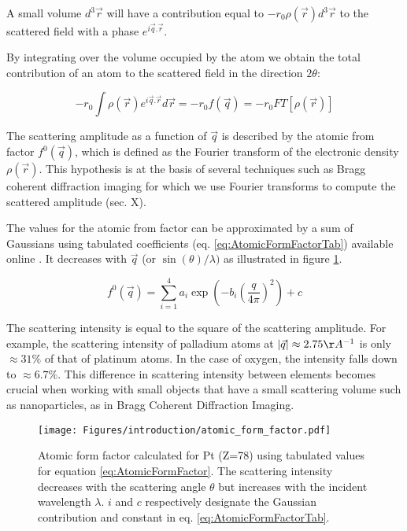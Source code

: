 A small volume $d^3\vec{r}$ will have a contribution equal to $-r_0 \rho(\vec{r})d^3\vec{r}$ to the scattered field with a phase $e^{i\vec{q}.\vec{r}}$.

By integrating over the volume occupied by the atom we obtain the total contribution of an atom to the scattered field in the direction $2\theta$:

\begin{equation}
    \label{eq:AtomicFormFactor}
    -r_0 \int \rho (\vec{r}) e^{i\vec{q}.\vec{r}} d\vec{r} = -r_0 f(\vec{q}) = -r_0 FT [\rho (\vec{r})]
\end{equation}

The scattering amplitude as a function of $\vec{q}$ is described by the atomic from factor $f^0(\vec{q})$, which is defined as the Fourier transform of the electronic density $\rho(\vec{r})$.
This hypothesis is at the basis of several techniques such as Bragg coherent diffraction imaging for which we use Fourier transforms to compute the scattered amplitude (sec. X).

The values for the atomic from factor can be approximated by a sum of Gaussians using tabulated coefficients (eq. \ref{eq:AtomicFormFactorTab}) available online \parencite{InterTablesOfCryst}.
It decreases with $\vec{q}$ (or $\sin(\theta) / \lambda)$ as illustrated in figure \ref{fig:atomic_form_factor}.

\begin{equation}
    \label{eq:AtomicFormFactorTab}
    f^0(\vec{q}) = \sum_{i=1}^4 a_i \exp (-b_i (\frac{q} {4\pi})^2) + c
\end{equation}

The scattering intensity is equal to the square of the scattering amplitude.
For example, the scattering intensity of palladium atoms at $|\vec{q}| \approx 2.75 \AA^{-1}$ is only $\approx 31\%$ of that of platinum atoms. In the case of oxygen, the intensity falls down to $\approx 6.7\%$.
This difference in scattering intensity between elements becomes crucial when working with small objects that have a small scattering volume such as nanoparticles, as in Bragg Coherent Diffraction Imaging.

\begin{figure}[!htb]
    \centering
    \texttt{[image: Figures/introduction/atomic\_form\_factor.pdf]}
    \caption{
    Atomic form factor calculated for Pt (Z=78) using tabulated values \parencite{InterTablesOfCryst} for equation \ref{eq:AtomicFormFactor}. The scattering intensity decreases with the scattering angle $\theta$ but increases with the incident wavelength $\lambda$. $i$ and $c$ respectively designate the Gaussian contribution and constant in eq. \ref{eq:AtomicFormFactorTab}.
    }
    \label{fig:atomic_form_factor}
\end{figure}


